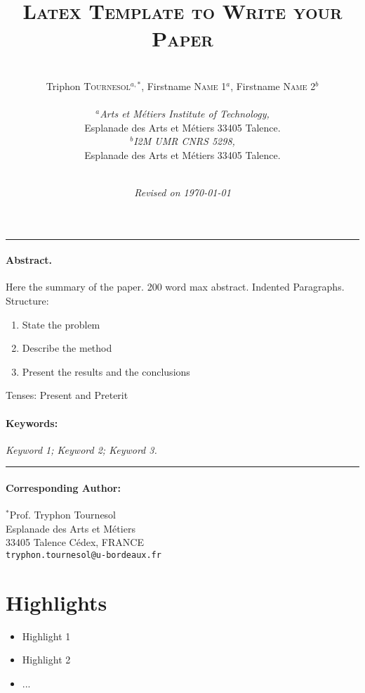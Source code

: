 \documentclass[12pt,a4paper]{article}
\author{\\
Triphon \textsc{Tournesol}$^{a,*}$, Firstname \textsc{Name} 1$^a$, Firstname \textsc{Name} 2$^b$\\ \\
  {\small \textit{$^a$Arts et Métiers Institute of Technology,}}\\
  {\small  Esplanade des Arts et Métiers	 33405 Talence.}\\ 
  {\small  \textit{$^b$I2M UMR CNRS 5298,}}\\
  {\small  Esplanade des Arts et Métiers	 33405 Talence.}\\   \\
   }
\title{{\Large \textsc{Latex Template to Write your Paper}}}
\date{\textit{Revised on \today}}
\begin{document}
\maketitle
\par\noindent\rule{\textwidth}{0.4pt}\vspace{-0.5cm}
\paragraph{Abstract.}

Here the summary of the paper.
200 word max abstract.  Indented Paragraphs. \\
Structure:
\begin{enumerate}
\item	State the problem
\item	Describe the method
\item	Present the results and the conclusions
\end{enumerate}

Tenses: Present and Preterit


\paragraph{Keywords:}
\textit{Keyword 1; Keyword 2; Keyword 3.}


\vspace{-0.2cm}\par\noindent\rule{\textwidth}{0.4pt}

\paragraph{Corresponding Author:}
 $^*$Prof. Tryphon Tournesol\\
Esplanade des Arts et Métiers\\
33405 Talence Cédex, FRANCE\\
 \texttt{tryphon.tournesol@u-bordeaux.fr}\\

\clearpage
\section*{Highlights}
\begin{itemize}
\item Highlight 1
\item Highlight 2
\item ...
\end{itemize}
\clearpage
\end{document}
